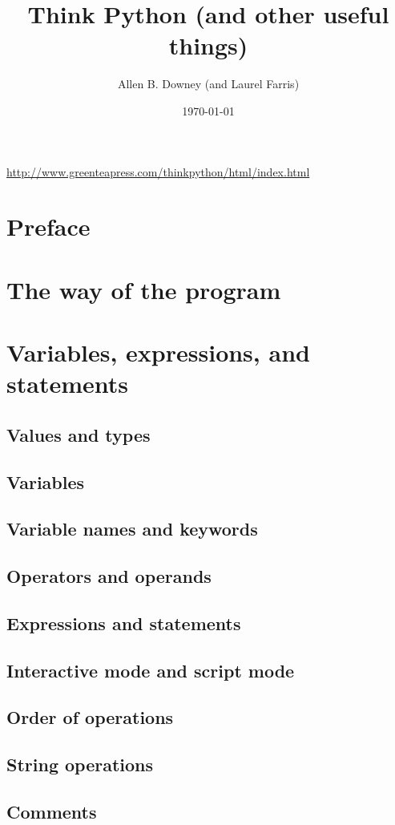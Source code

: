 \documentclass{article}
\title{Think Python (and other useful things)}
\author{Allen B. Downey (and Laurel Farris)}
\date{\today}
\begin{document}
\maketitle
\url{http://www.greenteapress.com/thinkpython/html/index.html}
\section*{Preface}
\section{The way of the program}
\section{Variables, expressions, and statements}
\subsection{Values and types}
\subsection{Variables}
\subsection{Variable names and keywords}
\subsection{Operators and operands}
\subsection{Expressions and statements}
\subsection{Interactive mode and script mode}
\subsection{Order of operations}
\subsection{String operations}
\subsection{Comments}
\end{document}
